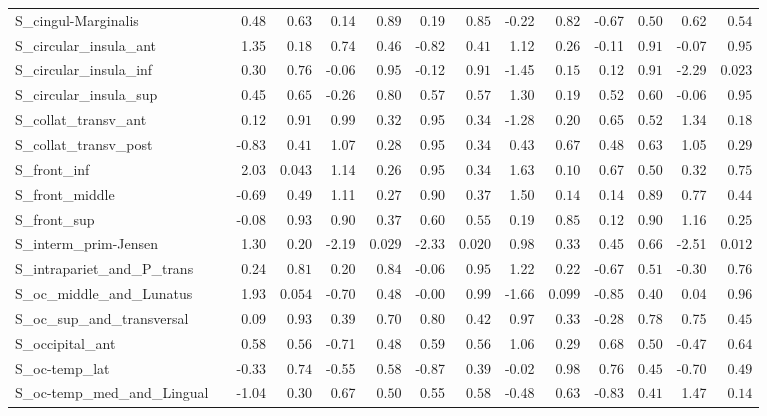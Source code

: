 {\begin{longtable}{llrrrrrrrrrrrr}
S\_cingul-Marginalis &  & 0.48 & $0.63$ & 0.14 & $0.89$ & 0.19 & $0.85$ & -0.22 & $0.82$ & -0.67 & $0.50$ & 0.62 & $0.54$ \\
S\_circular\_insula\_ant &  & 1.35 & $0.18$ & 0.74 & $0.46$ & -0.82 & $0.41$ & 1.12 & $0.26$ & -0.11 & $0.91$ & -0.07 & $0.95$ \\
S\_circular\_insula\_inf &  & 0.30 & $0.76$ & -0.06 & $0.95$ & -0.12 & $0.91$ & -1.45 & $0.15$ & 0.12 & $0.91$ & -2.29 & $0.023$ \\
S\_circular\_insula\_sup &  & 0.45 & $0.65$ & -0.26 & $0.80$ & 0.57 & $0.57$ & 1.30 & $0.19$ & 0.52 & $0.60$ & -0.06 & $0.95$ \\
S\_collat\_transv\_ant &  & 0.12 & $0.91$ & 0.99 & $0.32$ & 0.95 & $0.34$ & -1.28 & $0.20$ & 0.65 & $0.52$ & 1.34 & $0.18$ \\
S\_collat\_transv\_post &  & -0.83 & $0.41$ & 1.07 & $0.28$ & 0.95 & $0.34$ & 0.43 & $0.67$ & 0.48 & $0.63$ & 1.05 & $0.29$ \\
S\_front\_inf &  & 2.03 & $0.043$ & 1.14 & $0.26$ & 0.95 & $0.34$ & 1.63 & $0.10$ & 0.67 & $0.50$ & 0.32 & $0.75$ \\
S\_front\_middle &  & -0.69 & $0.49$ & 1.11 & $0.27$ & 0.90 & $0.37$ & 1.50 & $0.14$ & 0.14 & $0.89$ & 0.77 & $0.44$ \\
S\_front\_sup &  & -0.08 & $0.93$ & 0.90 & $0.37$ & 0.60 & $0.55$ & 0.19 & $0.85$ & 0.12 & $0.90$ & 1.16 & $0.25$ \\
S\_interm\_prim-Jensen &  & 1.30 & $0.20$ & -2.19 & $0.029$ & -2.33 & $0.020$ & 0.98 & $0.33$ & 0.45 & $0.66$ & -2.51 & $0.012$ \\
S\_intrapariet\_and\_P\_trans &  & 0.24 & $0.81$ & 0.20 & $0.84$ & -0.06 & $0.95$ & 1.22 & $0.22$ & -0.67 & $0.51$ & -0.30 & $0.76$ \\
S\_oc\_middle\_and\_Lunatus &  & 1.93 & $0.054$ & -0.70 & $0.48$ & -0.00 & $0.99$ & -1.66 & $0.099$ & -0.85 & $0.40$ & 0.04 & $0.96$ \\
S\_oc\_sup\_and\_transversal &  & 0.09 & $0.93$ & 0.39 & $0.70$ & 0.80 & $0.42$ & 0.97 & $0.33$ & -0.28 & $0.78$ & 0.75 & $0.45$ \\
S\_occipital\_ant &  & 0.58 & $0.56$ & -0.71 & $0.48$ & 0.59 & $0.56$ & 1.06 & $0.29$ & 0.68 & $0.50$ & -0.47 & $0.64$ \\
S\_oc-temp\_lat &  & -0.33 & $0.74$ & -0.55 & $0.58$ & -0.87 & $0.39$ & -0.02 & $0.98$ & 0.76 & $0.45$ & -0.70 & $0.49$ \\
S\_oc-temp\_med\_and\_Lingual &  & -1.04 & $0.30$ & 0.67 & $0.50$ & 0.55 & $0.58$ & -0.48 & $0.63$ & -0.83 & $0.41$ & 1.47 & $0.14$ \\

\end{longtable}}
